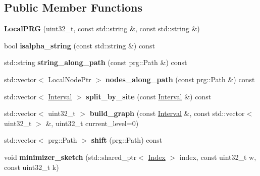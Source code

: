 \subsection*{Public Member Functions}
\begin{DoxyCompactItemize}
\item 
\mbox{\label{classLocalPRG_a1729caff2615403d128a1eef7315e628}} 
{\bfseries Local\+P\+RG} (uint32\+\_\+t, const std\+::string \&, const std\+::string \&)
\item 
\mbox{\label{classLocalPRG_a66967eea834a60152a06d7fa86e6acf4}} 
bool {\bfseries isalpha\+\_\+string} (const std\+::string \&) const
\item 
\mbox{\label{classLocalPRG_a8041fa9e8e7778df63717ae6f42e2a2d}} 
std\+::string {\bfseries string\+\_\+along\+\_\+path} (const prg\+::\+Path \&) const
\item 
\mbox{\label{classLocalPRG_ad32899108525a9513bccfd28dc88bb55}} 
std\+::vector$<$ Local\+Node\+Ptr $>$ {\bfseries nodes\+\_\+along\+\_\+path} (const prg\+::\+Path \&) const
\item 
\mbox{\label{classLocalPRG_a8754af497c7dfa032180aab230409915}} 
std\+::vector$<$ \hyperlink{structInterval}{Interval} $>$ {\bfseries split\+\_\+by\+\_\+site} (const \hyperlink{structInterval}{Interval} \&) const
\item 
\mbox{\label{classLocalPRG_a3b66546b0da44781f6b5c0dd1c25642d}} 
std\+::vector$<$ uint32\+\_\+t $>$ {\bfseries build\+\_\+graph} (const \hyperlink{structInterval}{Interval} \&, const std\+::vector$<$ uint32\+\_\+t $>$ \&, uint32\+\_\+t current\+\_\+level=0)
\item 
\mbox{\label{classLocalPRG_a3474c581e00373d41ec304ee3886b1c6}} 
std\+::vector$<$ prg\+::\+Path $>$ {\bfseries shift} (prg\+::\+Path) const
\item 
\mbox{\label{classLocalPRG_a9873a8f72a0bea283e6f399078b08f60}} 
void {\bfseries minimizer\+\_\+sketch} (std\+::shared\+\_\+ptr$<$ \hyperlink{classIndex}{Index} $>$ index, const uint32\+\_\+t w, const uint32\+\_\+t k)
\item 

\end{DoxyCompactItemize}
